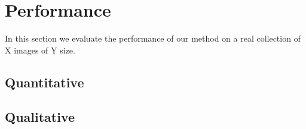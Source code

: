 \section{Performance}\label{sec:performance}

In this section we evaluate the performance of our method
on a real collection of X images of Y size.

\subsection{Quantitative}\label{ssec:quant}


\subsection{Qualitative}\label{ssec:qual}
